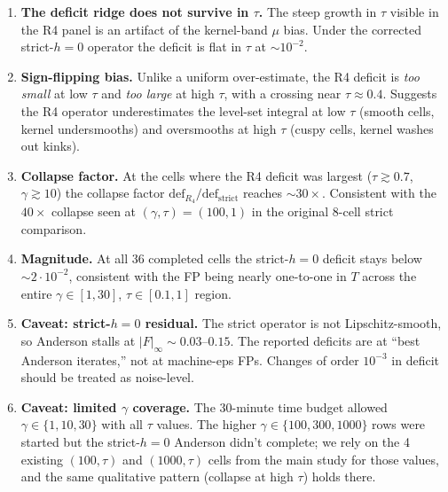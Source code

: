 \documentclass[11pt]{article}
\begin{document}
\begin{enumerate}
  \item \textbf{The deficit ridge does not survive in $\tau$.}
        The steep growth in $\tau$ visible in the R4 panel is an artifact
        of the kernel-band $\mu$ bias. Under the corrected strict-$h{=}0$
        operator the deficit is flat in $\tau$ at $\sim 10^{-2}$.
  \item \textbf{Sign-flipping bias.}
        Unlike a uniform over-estimate, the R4 deficit is \emph{too small}
        at low $\tau$ and \emph{too large} at high $\tau$, with a
        crossing near $\tau \approx 0.4$. Suggests the R4 operator
        underestimates the level-set integral at low $\tau$ (smooth
        cells, kernel undersmooths) and oversmooths at high $\tau$
        (cuspy cells, kernel washes out kinks).
  \item \textbf{Collapse factor.}
        At the cells where the R4 deficit was largest
        ($\tau \!\gtrsim\! 0.7$, $\gamma \!\gtrsim\! 10$) the collapse
        factor $\mathrm{def}_{R_4}/\mathrm{def}_{\mathrm{strict}}$
        reaches $\sim 30\times$. Consistent with the $40\times$ collapse
        seen at $(\gamma, \tau) = (100, 1)$ in the original 8-cell strict
        comparison.
  \item \textbf{Magnitude.}
        At all 36 completed cells the strict-$h{=}0$ deficit stays
        below $\sim 2 \cdot 10^{-2}$, consistent with the FP being
        nearly one-to-one in $T$ across the entire $\gamma \in [1, 30]$,
        $\tau \in [0.1, 1]$ region.
  \item \textbf{Caveat: strict-$h{=}0$ residual.}
        The strict operator is not Lipschitz-smooth, so Anderson stalls at
        $|F|_\infty \sim 0.03$--$0.15$. The reported deficits are at
        ``best Anderson iterates,'' not at machine-eps FPs. Changes of
        order $10^{-3}$ in deficit should be treated as noise-level.
  \item \textbf{Caveat: limited $\gamma$ coverage.}
        The 30-minute time budget allowed $\gamma \in \{1, 10, 30\}$
        with all $\tau$ values. The higher $\gamma \in \{100, 300, 1000\}$
        rows were started but the strict-$h{=}0$ Anderson didn't
        complete; we rely on the 4 existing $(100, \tau)$ and
        $(1000, \tau)$ cells from the main study for those values, and
        the same qualitative pattern (collapse at high $\tau$) holds
        there.
\end{enumerate}
\end{document}
